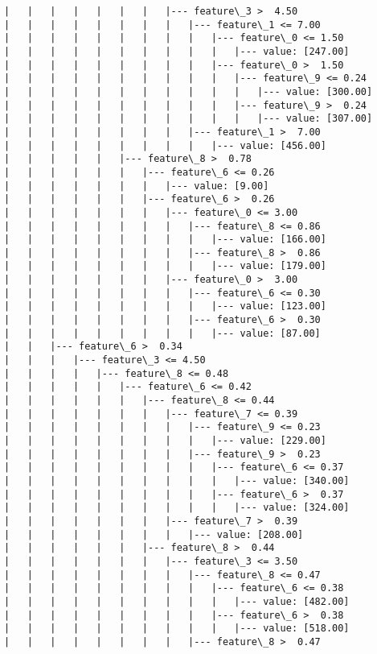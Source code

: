\documentclass[11pt]{article}
\begin{document}
\begin{Verbatim}[commandchars=\\\{\}]
|   |   |   |   |   |   |   |--- feature\_3 >  4.50
|   |   |   |   |   |   |   |   |--- feature\_1 <= 7.00
|   |   |   |   |   |   |   |   |   |--- feature\_0 <= 1.50
|   |   |   |   |   |   |   |   |   |   |--- value: [247.00]
|   |   |   |   |   |   |   |   |   |--- feature\_0 >  1.50
|   |   |   |   |   |   |   |   |   |   |--- feature\_9 <= 0.24
|   |   |   |   |   |   |   |   |   |   |   |--- value: [300.00]
|   |   |   |   |   |   |   |   |   |   |--- feature\_9 >  0.24
|   |   |   |   |   |   |   |   |   |   |   |--- value: [307.00]
|   |   |   |   |   |   |   |   |--- feature\_1 >  7.00
|   |   |   |   |   |   |   |   |   |--- value: [456.00]
|   |   |   |   |   |--- feature\_8 >  0.78
|   |   |   |   |   |   |--- feature\_6 <= 0.26
|   |   |   |   |   |   |   |--- value: [9.00]
|   |   |   |   |   |   |--- feature\_6 >  0.26
|   |   |   |   |   |   |   |--- feature\_0 <= 3.00
|   |   |   |   |   |   |   |   |--- feature\_8 <= 0.86
|   |   |   |   |   |   |   |   |   |--- value: [166.00]
|   |   |   |   |   |   |   |   |--- feature\_8 >  0.86
|   |   |   |   |   |   |   |   |   |--- value: [179.00]
|   |   |   |   |   |   |   |--- feature\_0 >  3.00
|   |   |   |   |   |   |   |   |--- feature\_6 <= 0.30
|   |   |   |   |   |   |   |   |   |--- value: [123.00]
|   |   |   |   |   |   |   |   |--- feature\_6 >  0.30
|   |   |   |   |   |   |   |   |   |--- value: [87.00]
|   |   |--- feature\_6 >  0.34
|   |   |   |--- feature\_3 <= 4.50
|   |   |   |   |--- feature\_8 <= 0.48
|   |   |   |   |   |--- feature\_6 <= 0.42
|   |   |   |   |   |   |--- feature\_8 <= 0.44
|   |   |   |   |   |   |   |--- feature\_7 <= 0.39
|   |   |   |   |   |   |   |   |--- feature\_9 <= 0.23
|   |   |   |   |   |   |   |   |   |--- value: [229.00]
|   |   |   |   |   |   |   |   |--- feature\_9 >  0.23
|   |   |   |   |   |   |   |   |   |--- feature\_6 <= 0.37
|   |   |   |   |   |   |   |   |   |   |--- value: [340.00]
|   |   |   |   |   |   |   |   |   |--- feature\_6 >  0.37
|   |   |   |   |   |   |   |   |   |   |--- value: [324.00]
|   |   |   |   |   |   |   |--- feature\_7 >  0.39
|   |   |   |   |   |   |   |   |--- value: [208.00]
|   |   |   |   |   |   |--- feature\_8 >  0.44
|   |   |   |   |   |   |   |--- feature\_3 <= 3.50
|   |   |   |   |   |   |   |   |--- feature\_8 <= 0.47
|   |   |   |   |   |   |   |   |   |--- feature\_6 <= 0.38
|   |   |   |   |   |   |   |   |   |   |--- value: [482.00]
|   |   |   |   |   |   |   |   |   |--- feature\_6 >  0.38
|   |   |   |   |   |   |   |   |   |   |--- value: [518.00]
|   |   |   |   |   |   |   |   |--- feature\_8 >  0.47

\end{Verbatim}
\end{document}
